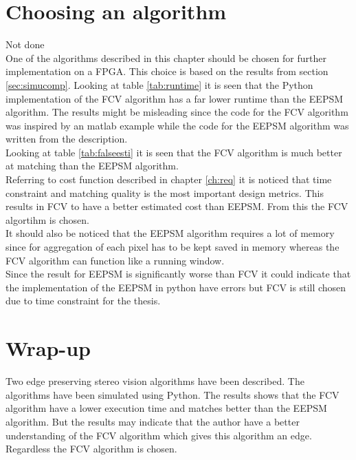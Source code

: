 \section{Choosing an algorithm}
Not done\\
One of the algorithms described in this chapter should be chosen for further implementation on a FPGA. This choice is based on the results from section \vref{sec:simucomp}. Looking at table \ref{tab:runtime} it is seen that the Python implementation of the FCV algorithm has a far lower runtime than the EEPSM algorithm. The results might be misleading since the code for the FCV algorithm was inspired by an matlab example while the code for the EEPSM algorithm was written from the description.\\

Looking at table \vref{tab:falseesti} it is seen that the FCV algorithm is much better at matching than the EEPSM algorithm.\\

Referring to cost function described in chapter \vref{ch:req} it is noticed that time constraint and matching quality is the most important design metrics. This results in FCV to have a better estimated cost than EEPSM. From this the FCV algortihm is chosen.\\

It should also be noticed that the EEPSM algorithm requires a lot of memory since for aggregation of each pixel has to be kept saved in memory whereas the FCV algorithm can function like a running window. \\

Since the result for EEPSM is significantly worse than FCV it could indicate that the implementation of the EEPSM in python have errors but FCV is still chosen due to time constraint for the thesis. 

\section{Wrap-up}
Two edge preserving stereo vision algorithms have been described. The algorithms have been simulated using Python. The results shows that the FCV algorithm have a lower execution time and matches better than the EEPSM algorithm. But the results may indicate that the author have a better understanding of the FCV algorithm which gives this algorithm an edge. Regardless the FCV algorithm is chosen. 